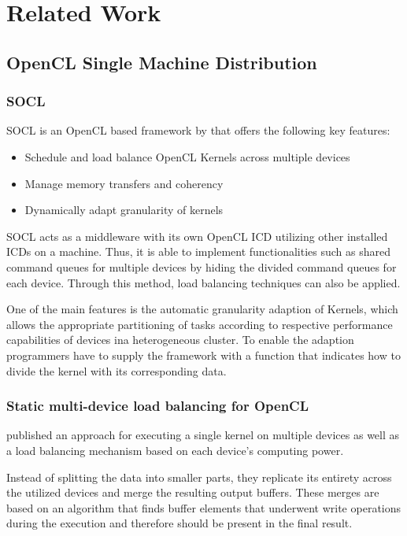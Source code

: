 \chapter{Related Work}
\label{related}

\section{OpenCL Single Machine Distribution}

\subsection*{SOCL}
SOCL is an OpenCL based framework by \citeauthor{socl} that offers the following key features\cite{socl}:
\begin{itemize}
    \item Schedule and load balance OpenCL Kernels across multiple devices
    \item Manage memory transfers and coherency
    \item Dynamically adapt granularity of kernels
\end{itemize}

SOCL acts as a middleware with its own OpenCL ICD utilizing other installed ICDs on a machine. Thus, it is able to implement functionalities such as shared command queues for multiple devices by hiding the divided command queues for each device. Through this method, load balancing techniques can also be applied.

One of the main features is the automatic granularity adaption of Kernels, which allows the appropriate partitioning of tasks according to respective performance capabilities of devices ina heterogeneous cluster. To enable the adaption programmers have to supply the framework with a function that indicates how to divide the kernel with its corresponding data.

\subsection*{Static multi-device load balancing for OpenCL}
\citeauthor{delalama_2012} published an approach for executing a single kernel on multiple devices as well as a load balancing mechanism based on each device's computing power\cite{delalama_2012}.

Instead of splitting the data into smaller parts, they replicate its entirety across the utilized devices and merge the resulting output buffers. These merges are based on an algorithm that finds buffer elements that underwent write operations during the execution and therefore should be present in the final result.


